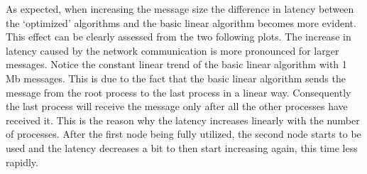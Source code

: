     As expected, when increasing the message size the difference in latency
    between the \enquote*{optimized} algorithms and the basic linear
    algorithm becomes more evident. This effect can be clearly assessed
    from the two following plots. The increase in latency caused by the
    network communication is more pronounced for larger messages. Notice
    the constant linear trend of the basic linear algorithm with 1 Mb
    messages. This is due to the fact that the basic linear algorithm
    sends the message from the root process to the last process in a
    linear way. Consequently the last process will receive the message
    only after all the other processes have received it. This is the
    reason why the latency increases linearly with the number of processes.
    After the first node being fully utilized, the second node starts to
    be used and the latency decreases a bit to then start increasing again,
    this time less rapidly.

